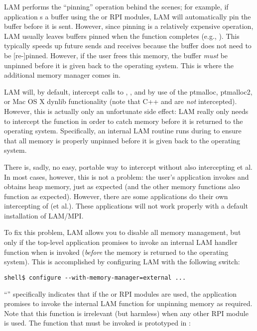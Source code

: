 LAM performs the ``pinning'' operation behind the scenes; for example,
if application s a buffer using the  or
 RPI modules, LAM will automatically pin the buffer before it
is sent.  However, since pinning is a relatively expensive operation,
LAM usually leaves buffers pinned when the function completes (e.g.,
).  This typically speeds up future sends and
receives because the buffer does not need to be [re-]pinned.  However,
if the user frees this memory, the buffer {\em must} be unpinned
before it is given back to the operating system.  This is where the
additional memory manager comes in.

LAM will, by default, intercept calls to ,
, and  by use of the ptmalloc, ptmalloc2,
or Mac OS X dynlib functionality (note that C++  and
 are {\em not} intercepted).  However, this is actually
only an unfortunate side effect: LAM really only needs to intercept
the  function in order to catch memory before it is
returned to the operating system.  Specifically, an internal LAM
routine runs during  to ensure that all memory is
properly unpinned before it is given back to the operating system.

There is, sadly, no easy, portable way to intercept 
without also intercepting  et al.  In most cases,
however, this is not a problem: the user's application invokes
 and obtains heap memory, just as expected (and the
other memory functions also function as expected).  However, there are
some applications do their own intercepting of  (et
al.).  These applications will not work properly with a default
installation of LAM/MPI.

To fix this problem, LAM allows you to disable all memory management,
but only if the top-level application promises to invoke an internal
LAM handler function when  is invoked ({\em before} the
memory is returned to the operating system).  This is accomplished by
configuring LAM with the following switch:

\lstset{style=lam-cmdline}
\begin{lstlisting}
shell$ configure --with-memory-manager=external ...
\end{lstlisting}

``'' specifically indicates that if the  or
 RPI modules are used, the application promises to invoke the
internal LAM function for unpinning memory as required.  Note that
this function is irrelevant (but harmless) when any other RPI module
is used.  The function that must be invoked is prototyped in
:

